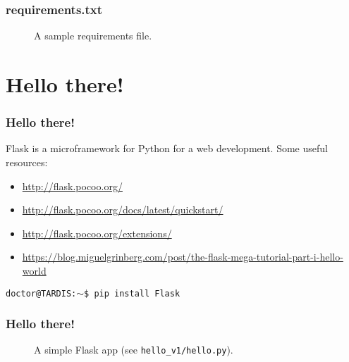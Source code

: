 \documentclass{beamer}
\newcommand{\bashcmd}[1]{\vspace{1mm}\hspace{5mm}\texttt{#1\\}\vspace{1mm}}
\begin{document}
\begin{frame}
  \frametitle{requirements.txt}

  \begin{figure}
    \caption{A sample requirements file.}
  \end{figure}
\end{frame}

\section{Hello there!}

\begin{frame}
  \frametitle{Hello there!}

  Flask is a microframework for Python for a web development. \pause Some useful resources:
  \begin{itemize}
    \item \url{http://flask.pocoo.org/}
    \item \url{http://flask.pocoo.org/docs/latest/quickstart/}
    \item \url{http://flask.pocoo.org/extensions/}
    \item \url{https://blog.miguelgrinberg.com/post/the-flask-mega-tutorial-part-i-hello-world}
  \end{itemize}

  \vspace{3mm}

  \pause \bashcmd{doctor@TARDIS:$\sim$\$ pip install Flask}

\end{frame}

\begin{frame}
  \frametitle{Hello there!}

  \begin{figure}
    \caption{A simple Flask app (see \texttt{hello\_v1/hello.py}).}
  \end{figure}
\end{frame}
\end{document}
